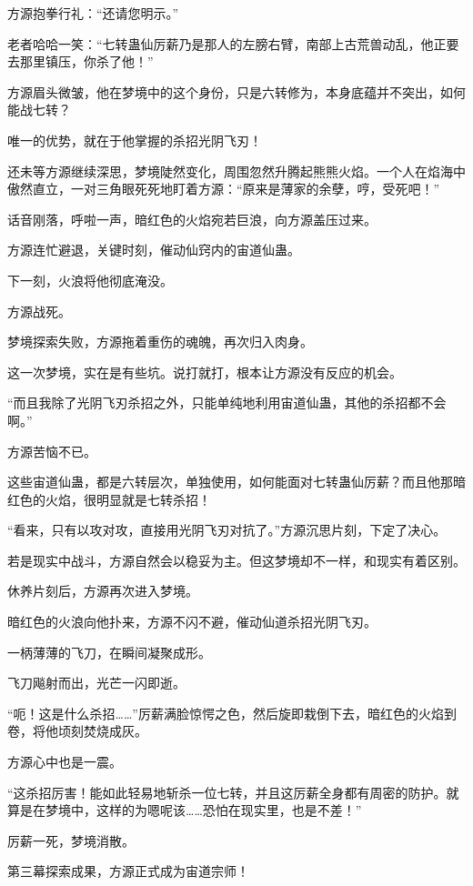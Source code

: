 \begin{this_body}
方源抱拳行礼：“还请您明示。”

老者哈哈一笑：“七转蛊仙厉薪乃是那人的左膀右臂，南部上古荒兽动乱，他正要去那里镇压，你杀了他！”

方源眉头微皱，他在梦境中的这个身份，只是六转修为，本身底蕴并不突出，如何能战七转？

唯一的优势，就在于他掌握的杀招光阴飞刃！

还未等方源继续深思，梦境陡然变化，周围忽然升腾起熊熊火焰。一个人在焰海中傲然直立，一对三角眼死死地盯着方源：“原来是薄家的余孽，哼，受死吧！”

话音刚落，呼啦一声，暗红色的火焰宛若巨浪，向方源盖压过来。

方源连忙避退，关键时刻，催动仙窍内的宙道仙蛊。

下一刻，火浪将他彻底淹没。

方源战死。

梦境探索失败，方源拖着重伤的魂魄，再次归入肉身。

这一次梦境，实在是有些坑。说打就打，根本让方源没有反应的机会。

“而且我除了光阴飞刃杀招之外，只能单纯地利用宙道仙蛊，其他的杀招都不会啊。”

方源苦恼不已。

这些宙道仙蛊，都是六转层次，单独使用，如何能面对七转蛊仙厉薪？而且他那暗红色的火焰，很明显就是七转杀招！

“看来，只有以攻对攻，直接用光阴飞刃对抗了。”方源沉思片刻，下定了决心。

若是现实中战斗，方源自然会以稳妥为主。但这梦境却不一样，和现实有着区别。

休养片刻后，方源再次进入梦境。

暗红色的火浪向他扑来，方源不闪不避，催动仙道杀招光阴飞刃。

一柄薄薄的飞刀，在瞬间凝聚成形。

飞刀飚射而出，光芒一闪即逝。

“呃！这是什么杀招……”厉薪满脸惊愕之色，然后旋即栽倒下去，暗红色的火焰到卷，将他顷刻焚烧成灰。

方源心中也是一震。

“这杀招厉害！能如此轻易地斩杀一位七转，并且这厉薪全身都有周密的防护。就算是在梦境中，这样的为嗯呢该……恐怕在现实里，也是不差！”

厉薪一死，梦境消散。

第三幕探索成果，方源正式成为宙道宗师！

\end{this_body}

